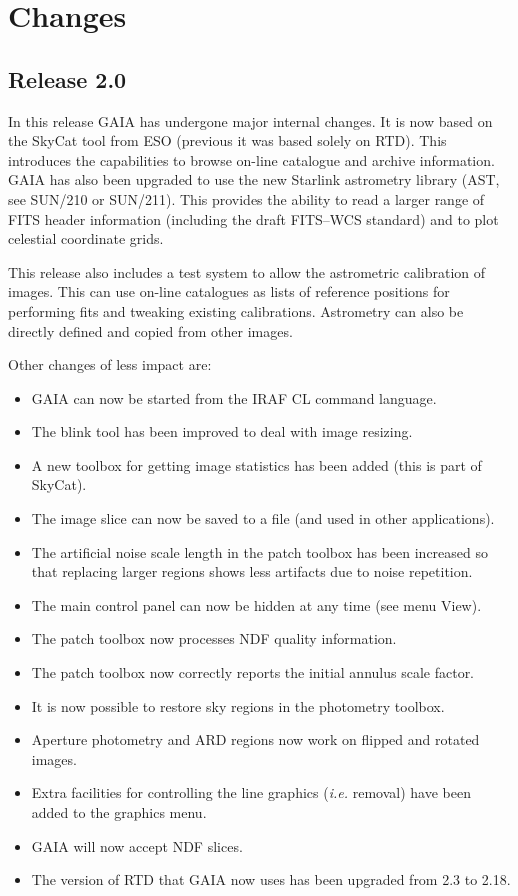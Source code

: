 \documentclass[twoside,11pt]{article}
\newcommand{\xref}[3]{#1}
\newcommand{\xlabel}[1]{}
\renewcommand{\_}{\texttt{\symbol{95}}}
\begin{document}
\section{\xlabel{changes}Changes}
\subsection{Release 2.0}
In this release GAIA has undergone major internal changes. It is now
based on the SkyCat tool from ESO (previous it was based solely on
RTD). This introduces the capabilities to browse on-line catalogue and
archive information. GAIA has also been upgraded to use the new
Starlink astrometry library (AST, see \xref{SUN/210}{sun210}{} or
\xref{SUN/211}{sun211}{}). This provides the ability to read a larger
range of FITS header information (including the draft FITS--WCS
standard) and to plot celestial coordinate grids.

This release also includes a test system to allow the astrometric
calibration of images. This can use on-line catalogues as lists of
reference positions for performing fits and tweaking existing
calibrations.  Astrometry can also be directly defined and copied from
other images.


Other changes of less impact are:
\begin{itemize}
\item GAIA can now be started from the IRAF CL command language.
\item The blink tool has been improved to deal with image resizing.
\item A new toolbox for getting image statistics has been added (this
is part of SkyCat).
\item The image slice can now be saved to a file (and used in other
applications).
\item The artificial noise scale length in the patch toolbox has been
increased so that replacing larger regions shows less artifacts due to
noise repetition.
\item The main control panel can now be hidden at any time (see menu View).
\item The patch toolbox now processes NDF quality information.
\item The patch toolbox now correctly reports the initial annulus scale factor.
\item It is now possible to restore sky regions in the photometry toolbox.
\item Aperture photometry and ARD regions now work on flipped and
rotated images.
\item Extra facilities for controlling the line graphics ({\em i.e.} removal)
have been added to the graphics menu.
\item GAIA will now accept NDF slices.
\item The version of RTD that GAIA now uses has been upgraded from
      2.3 to 2.18.
\end{itemize}
\end{document}
